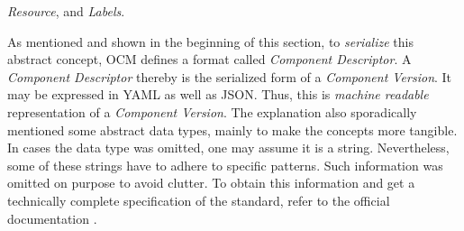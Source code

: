 \emph{Resource}, and \emph{Labels}.\par
\noindent As mentioned and shown in the beginning of this section, to \emph{serialize} this abstract concept, OCM defines a format called \emph{Component Descriptor}. A \emph{Component Descriptor} thereby is the serialized form of a \emph{Component Version}. It may be expressed in YAML as well as JSON. Thus, this is \emph{machine readable} representation of a \emph{Component Version}. The explanation also sporadically mentioned some abstract data types, mainly to make the concepts more tangible. In cases the data type was omitted, one may assume it is a string. Nevertheless, some of these strings have to adhere to specific patterns. Such information was omitted on purpose to avoid clutter. To obtain this information and get a technically complete specification of the standard, refer to the official documentation \cite{OCMSpec}.

